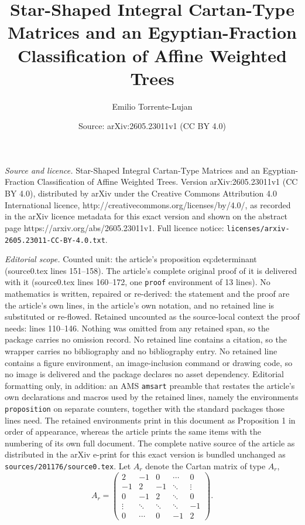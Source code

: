 \documentclass[10pt,a4paper]{amsart}
\title{Star-Shaped Integral Cartan-Type Matrices and an Egyptian-Fraction Classification of Affine Weighted Trees}
\author{Emilio Torrente-Lujan}
\date{Source: arXiv:2605.23011v1 (CC BY 4.0)}
\begin{document}
\maketitle

\noindent\emph{Source and licence.} Star-Shaped Integral Cartan-Type Matrices and an Egyptian-Fraction Classification of Affine Weighted Trees. Version arXiv:2605.23011v1 (CC BY 4.0), distributed by arXiv under the Creative Commons Attribution 4.0 International licence, http://creativecommons.org/licenses/by/4.0/, as recorded in the arXiv licence metadata for this exact version and shown on the abstract page https://arxiv.org/abs/2605.23011v1. Full licence notice: \texttt{licenses/arxiv-2605.23011-CC-BY-4.0.txt}.\par\smallskip

\noindent\textit{Editorial scope.} Counted unit: the article's proposition eq:determinant (source0.tex lines 151--158). The article's complete original proof of it is delivered with it (source0.tex lines 160--172, one \texttt{proof} environment of 13 lines). No mathematics is written, repaired or re-derived: the statement and the proof are the article's own lines, in the article's own notation, and no retained line is substituted or re-flowed.  Retained uncounted as the source-local context the proof needs: lines 110--146.  Nothing was omitted from any retained span, so the package carries no omission record.  No retained line contains a citation, so the wrapper carries no bibliography and no bibliography entry.  No retained line contains a figure environment, an image-inclusion command or drawing code, so no image is delivered and the package declares no asset dependency.  Editorial formatting only, in addition: an AMS \texttt{amsart} preamble that restates the article's own declarations and macros used by the retained lines, namely the environments \texttt{proposition} on separate counters, together with the standard packages those lines need.  The retained environments print in this document as Proposition 1 in order of appearance, whereas the article prints the same items with the numbering of its own full document.  The complete native source of the article as distributed in the arXiv e-print for this exact version is bundled unchanged as \texttt{sources/201176/source0.tex}.
Let $A_r$ denote the Cartan matrix of type $A_r$,
\[
A_r=\begin{pmatrix}
2&-1&0&\cdots&0\\
-1&2&-1&\ddots&\vdots\\
0&-1&2&\ddots&0\\
\vdots&\ddots&\ddots&\ddots&-1\\
0&\cdots&0&-1&2
\end{pmatrix}.
\]
\end{document}
